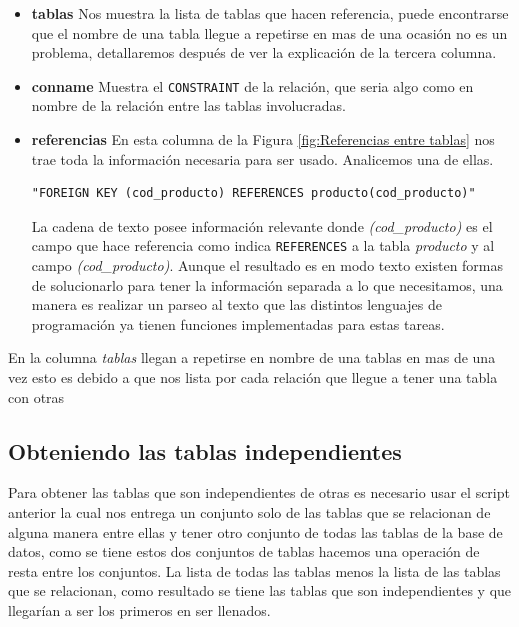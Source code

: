 \begin{itemize}
\item \textbf{tablas} Nos muestra la lista de tablas que hacen referencia, puede encontrarse que el nombre de una tabla llegue a repetirse en mas de una ocasi\'on no es un problema, detallaremos despu\'es de ver la explicaci\'on de la tercera columna.   
\item \textbf{conname} Muestra el \texttt{CONSTRAINT} de la relaci\'on, que seria algo como en nombre de la relaci\'on entre las tablas involucradas. 
\item \textbf{referencias} En esta columna de la Figura \ref{fig:Referencias entre tablas} nos trae toda la informaci\'on necesaria para ser usado. Analicemos una de ellas.
\lstset{language=sql,breaklines=true}
\begin{lstlisting}
"FOREIGN KEY (cod_producto) REFERENCES producto(cod_producto)"
\end{lstlisting}
La cadena de texto posee informaci\'on relevante donde \emph{(cod\_producto)} es el campo que hace referencia como indica \texttt{REFERENCES} a la tabla \emph{producto} y al campo  \emph{(cod\_producto)}.
Aunque el resultado es en modo texto existen formas de solucionarlo para tener la informaci\'on separada a lo que necesitamos, una manera es realizar un parseo al texto que las distintos lenguajes de programaci\'on ya tienen funciones implementadas para estas tareas. 
\end{itemize}
En la columna \emph{tablas} llegan a repetirse en nombre de una tablas en mas de una vez esto es debido a que nos lista por cada relaci\'on que llegue a tener una tabla con otras
\subsection{Obteniendo las tablas independientes}
Para obtener las tablas que son independientes de otras es necesario usar el script anterior la cual nos entrega un conjunto solo de las tablas que se relacionan de alguna manera entre ellas y tener otro conjunto de todas las tablas de la base de datos, como se tiene estos dos conjuntos de tablas hacemos una operaci\'on de resta entre los conjuntos. La lista de todas las tablas menos la lista de las tablas que se relacionan, como resultado se tiene las tablas que son independientes y que llegar\'ian a ser los primeros en ser llenados.

